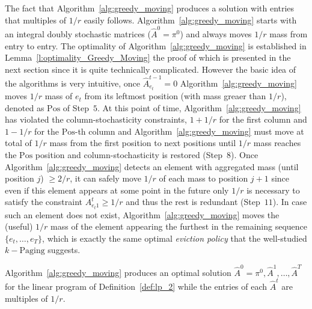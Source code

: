 The fact that Algorithm~\ref{alg:greedy_moving} produces a solution with entries that multiples of $1/r$ easily follows. Algorithm~\ref{alg:greedy_moving} starts with an integral doubly stochastic matrices ($\hat{A}^0 = \pi^0$) and always moves $1/r$ mass from entry to entry. The optimality of Algorithm~\ref{alg:greedy_moving} is established in Lemma~\ref{l:optimality_Greedy_Moving} the proof of which is presented in the next section since it is quite technically complicated. However the basic idea of the algorithms is very intuitive, once $\hat{A}^{t-1}_{e_t} = 0$ Algorithm~\ref{alg:greedy_moving} moves $1/r$ mass of $e_t$ from its leftmost position (with mass greaer than $1/r$), denoted as $\mathrm{Pos}$ of Step~$5$. At this point of time, Algorithm~\ref{alg:greedy_moving} has violated the column-stochasticity constraints, $1+1/r$ for the first column and $1-1/r$ for the $\mathrm{Pos}$-th column and Algorithm~\ref{alg:greedy_moving} must move at total of $1/r$ mass from the first position to next positions until $1/r$ mass reaches the $\mathrm{Pos}$ position and column-stochasticity is restored (Step~$8$). Once Algorithm~\ref{alg:greedy_moving} detects an element with aggregated mass (until position $j$) $\geq 2/r$, it can safely move $1/r$ of each mass to position $j+1$ since even if this element appears at some point in the future only $1/r$ is necessary to satisfy the constraint $A_{e_t 1}^t \geq 1/r$ and thus the rest is redundant (Step~$11$). In case such an element does not exist, Algorithm~\ref{alg:greedy_moving} moves the (useful) $1/r$ mass of the element appearing the furthest in the remaining sequence $\{e_t,\ldots,e_{T}\}$, which is exactly the same optimal \textit{eviction policy} that the well-studied $k-\mathrm{Paging}$ suggests. 

\begin{lemma}\label{l:optimality_Greedy_Moving} Algorithm~\ref{alg:greedy_moving} produces an optimal solution $\hat{A}^0=\pi^0,\hat{A}^1,\ldots,\hat{A}^T$ for the linear program of Definition~\ref{def:lp_2} while the entries of each $\hat{A}^t$ are multiples of $1/r$.
\end{lemma}

